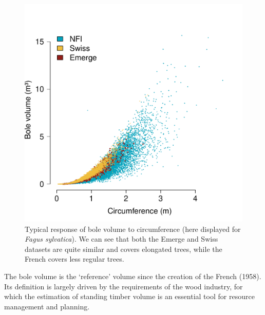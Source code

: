 \begin{figure}
	\centering
	\includegraphics[scale = 0.5]{Figures/resp_fagus.pdf}
	\caption{Typical response of bole volume to circumference (here displayed for \textit{Fagus sylvatica}). We can see that both the Emerge and Swiss datasets \parencite{Deleuze2013,Didion2024} are quite similar and covers elongated trees, while the French \NFI{} covers less regular trees. \label{fig::fagSyl}}
\end{figure}

\begin{tcolorbox}[breakable, title = Bole volume (volume bois-fort tige)]
	The bole volume is the `reference' volume since the creation of the French \NFI{} (1958). Its definition is largely driven by the requirements of the wood industry, for which the estimation of standing timber volume is an essential tool for resource management and planning.
\end{tcolorbox}